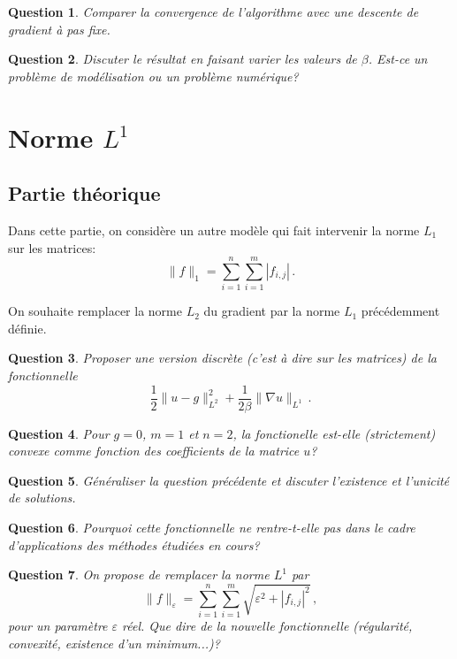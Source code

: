 \documentclass[10pt,a4paper,fleqn]{report}
\newtheorem{question}{Question}
\begin{document}
\begin{question}
Comparer la convergence de l'algorithme avec une descente de gradient \`a pas fixe.
\end{question}

\begin{question}
Discuter le r\'esultat en faisant varier les valeurs de $\beta$. Est-ce un probl\`eme de mod\'elisation ou un problème num\'erique?
\end{question}


\section{Norme $L^{1}$}
\subsection{Partie théorique}
Dans cette partie, on consid\`ere un autre mod\`ele qui fait intervenir la norme $L_1$ sur les matrices:
\begin{equation}
\| f \|_{1} = \sum_{i=1}^n \sum_{i=1}^m |f_{i,j}| \,.
\end{equation}

On souhaite remplacer la norme $L_2$ du gradient par la norme $L_1$ pr\'ec\'edemment d\'efinie.

\begin{question}
Proposer une version discr\`ete (c'est \`a dire sur les matrices) de la fonctionnelle $$ \frac12 \| u -  g\|^2_{L^2} + \frac{1}{2\beta}\| \nabla u \|_{L^1}\,.$$
\end{question}

\begin{question}
Pour $g=0$, $m=1$ et $n=2$, la fonctionelle est-elle (strictement) convexe comme fonction des coefficients de la matrice $u$?
\end{question}

\begin{question}
G\'en\'eraliser la question pr\'ec\'edente et discuter l'existence et l'unicit\'e de solutions.
\end{question}

\begin{question}
Pourquoi cette fonctionnelle ne rentre-t-elle pas dans le cadre d'applications des m\'ethodes \'etudi\'ees en cours?
\end{question}

\begin{question}
On propose de remplacer la norme $L^1$ par
\begin{equation}
\| f \|_{\varepsilon} = \sum_{i=1}^n \sum_{i=1}^m \sqrt{\varepsilon^2 + |f_{i,j}|^2} \,,
\end{equation}
pour un param\`etre $\varepsilon$ r\'eel.
Que dire de la nouvelle fonctionnelle (r\'egularit\'e, convexit\'e, existence d'un minimum...)?
\end{question}
\end{document}
